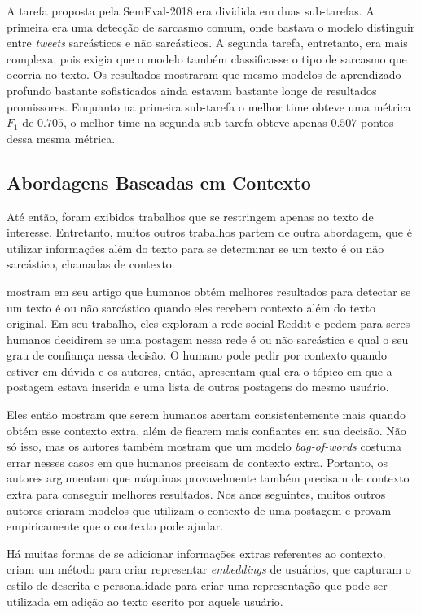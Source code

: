 A tarefa proposta pela SemEval-2018 era dividida em duas sub-tarefas. A primeira
era uma detecção de sarcasmo comum, onde bastava o modelo distinguir entre
\textit{tweets} sarcásticos e não sarcásticos. A segunda tarefa, entretanto, era
mais complexa, pois exigia que o modelo também classificasse o tipo de sarcasmo
que ocorria no texto. Os resultados mostraram que mesmo modelos de aprendizado
profundo bastante sofisticados ainda estavam bastante longe de resultados
promissores. Enquanto na primeira sub-tarefa o melhor time obteve uma métrica
$F_1$ de $0.705$, o melhor time na segunda sub-tarefa obteve apenas $0.507$
pontos dessa mesma métrica.

\subsection{Abordagens Baseadas em Contexto}%
\label{sub:abordagens_baseadas_em_contexto}

Até então, foram exibidos trabalhos que se restringem apenas ao texto de
interesse. Entretanto, muitos outros trabalhos partem de outra abordagem, que é
utilizar informações além do texto para se determinar se um texto é ou não
sarcástico, chamadas de contexto.

\cite{wallace-etal:2014:ironic-context} mostram em seu artigo que humanos obtém
melhores resultados para detectar se um texto é ou não sarcástico quando eles
recebem contexto além do texto original. Em seu trabalho, eles exploram a rede
social Reddit e pedem para seres humanos decidirem se uma postagem nessa rede é
ou não sarcástica e qual o seu grau de confiança nessa decisão. O humano pode
pedir por contexto quando estiver em dúvida e os autores, então, apresentam qual
era o tópico em que a postagem estava inserida e uma lista de outras postagens
do mesmo usuário.

Eles então mostram que serem humanos acertam consistentemente mais quando obtém
esse contexto extra, além de ficarem mais confiantes em sua decisão. Não só
isso, mas os autores também mostram que um modelo \textit{bag-of-words} costuma
errar nesses casos em que humanos precisam de contexto extra. Portanto, os
autores argumentam que máquinas provavelmente também precisam de contexto extra
para conseguir melhores resultados. Nos anos seguintes, muitos outros autores
criaram modelos que utilizam o contexto de uma postagem e provam empiricamente
que o contexto pode ajudar.

Há muitas formas de se adicionar informações extras referentes ao contexto.
\cite{hazarika-etal:2018:cascade} criam um método para criar representar
\textit{embeddings} de usuários, que capturam o estilo de descrita e
personalidade para criar uma representação que pode ser utilizada em adição ao
texto escrito por aquele usuário.

